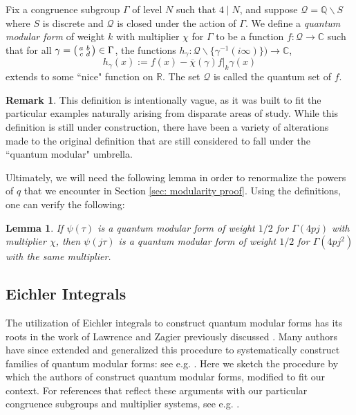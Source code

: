 \documentclass[11pt,letterpaper]{amsart}
\theoremstyle{definition}
\newtheorem*{remark}{Remark}
\theoremstyle{plain}
\newtheorem{lemma}[theorem]{Lemma}
\numberwithin{equation}{section}
\theoremstyle{example}
\begin{document}
Fix a congruence subgroup $\Gamma$ of level $N$ such that $4 \mid N$, and suppose $\mathcal{Q} = \mathbb{Q}\backslash S$ where $S$ is discrete and $\mathcal{Q}$ is closed under the action of $\Gamma$.
We define a \textit{quantum modular form} of weight $k$ with multiplier $\chi$ for $\Gamma$ to be a function $f\colon \mathcal{Q} \to \mathbb{C}$ such that for all $\gamma = \begin{psmallmatrix} a & b \\ c & d
\end{psmallmatrix} \in \Gamma$, the functions $h_\gamma\colon \mathcal{Q}\backslash \{\gamma^{-1}(i \infty)\}) \to \mathbb{C}$,
\begin{equation}h_\gamma(x) := f(x) - \overline{\chi}(\gamma)f|_k \gamma(x)\end{equation}
extends to some ``nice" function on $\mathbb{R}$. The set $\mathcal{Q}$ is called the quantum set of $f$.

\begin{remark} This definition is intentionally vague, as it was built to fit the particular examples naturally arising from disparate areas of study. While this definition is still under construction, there have been a variety of alterations made to the original definition that are still considered to fall under the ``quantum modular" umbrella.
\end{remark}

Ultimately, we will need the following lemma in order to renormalize the powers of $q$ that we encounter in Section \ref{sec: modularity proof}. 
Using the definitions, one can verify the following:
\begin{lemma}\label{lem:mult by j}
If $\psi(\tau)$ is a quantum modular form of weight $1/2$ for $\Gamma(4pj)$ with multiplier $\chi$, then $\psi(j\tau)$ is a quantum modular form of weight $1/2$ for $\Gamma(4pj^2)$ with the same multiplier.
\end{lemma}

\subsection{Eichler Integrals}\label{sec: eichler}

The utilization of Eichler integrals to construct quantum modular forms has its roots in the work of Lawrence and Zagier previously discussed \cite{lawrencezagier}. Many authors have since extended and generalized this procedure to systematically construct families of quantum modular forms: see e.g. \cite{folsomonorhoades, bringmannrolen, goswamiosburn}. 
Here we sketch the procedure by which the authors of \cite{bringmannrolen} construct quantum modular forms, modified to fit our context. For references that reflect these arguments with our particular congruence subgroups and multiplier systems, see e.g. \cite{bringmannmilaswalgebras, goswamiosburn}. 
\end{document}
